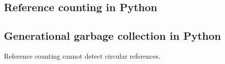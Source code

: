 
\subsection{Reference counting in Python}


\subsection{Generational garbage collection in Python}

Reference counting cannot detect circular references.


